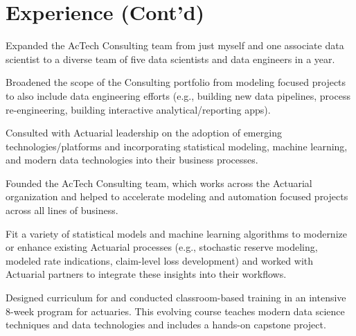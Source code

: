 \documentclass[letterpaper]{deedy-resume} %
\begin{document}
\begin{minipage}[t]{0.9\textwidth}

  \section{Experience (Cont'd)}
  
  \hfill
  \vspace{\topsep}
  \begin{tightitemize}
  \item  Expanded the AcTech Consulting team from just myself and one
    associate data scientist to a diverse team of five data scientists
    and data engineers in a year. 
  \item Broadened the scope of the Consulting portfolio from modeling focused projects to
    also include data engineering efforts (e.g., building new data
    pipelines, process re-engineering, building interactive
    analytical/reporting apps).
  \item Consulted with Actuarial leadership on the adoption of emerging
    technologies/platforms and incorporating statistical modeling,
    machine learning, and modern data technologies into their business
    processes.
  \end{tightitemize}
  \sectionspace
  
  \hfill{}
  \begin{tightitemize}
  \item   Founded the AcTech Consulting team, which works across the Actuarial
    organization and helped to accelerate modeling and automation
    focused projects across all lines of business. 
  \item Fit a variety of statistical models and machine learning
    algorithms to modernize or enhance existing Actuarial processes
    (e.g., stochastic reserve modeling, modeled rate indications, claim-level
    loss development) and worked with Actuarial partners to integrate
    these insights into their workflows.
  \item Designed curriculum for and conducted classroom-based training in an
    intensive 8-week program for actuaries. This evolving course teaches modern data
    science techniques and data technologies and includes a hands-on
    capstone project.
  \end{tightitemize}
  \sectionspace
  

\end{minipage}
\end{document}
